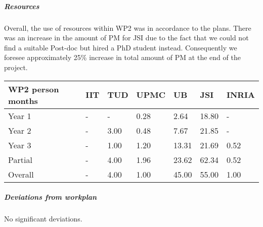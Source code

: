
\subparagraph*{Resources}
Overall, the use of resources within WP2 was in accordance to the plans. There was an increase in the amount of PM for JSI due to the fact that we could not find a suitable Post-doc but hired a PhD student instead. Consequently we foresee approximately 25\% increase in total amount of PM at the end of the project.

\begin{center}
\begin{tabular}{|C{1.5cm}|C{1.5cm}|C{1.5cm}|C{2cm}|C{2cm}|C{2cm}|C{2cm}|}
\hline
\footnotesize \textbf{WP2 person months}& \footnotesize \textbf{IIT}&\footnotesize \textbf{TUD}&\footnotesize \textbf{UPMC}& \footnotesize \textbf{UB} &\footnotesize \textbf{JSI} & \footnotesize \textbf{INRIA} \\ \hline
\footnotesize Year 1 &  -     & - & 0.28 & 2.64 & 18.80  &-  \\  \hline
\footnotesize Year 2 &  -     & 3.00 & 0.48 & 7.67 & 21.85  &-  \\  \hline
\footnotesize Year 3 &  - & 1.00 & 1.20 & 13.31 & 21.69 & 0.52  \\ \hline
\footnotesize Partial &  - & 4.00 & 1.96 & 23.62 & 62.34 & 0.52 \\
\hline \hline
\footnotesize Overall & -     & 4.00 & 1.00 & 45.00 & 55.00 & 1.00 \\ \hline
\end{tabular}
\end{center}

\subparagraph*{Deviations from workplan} 
No significant deviations.
